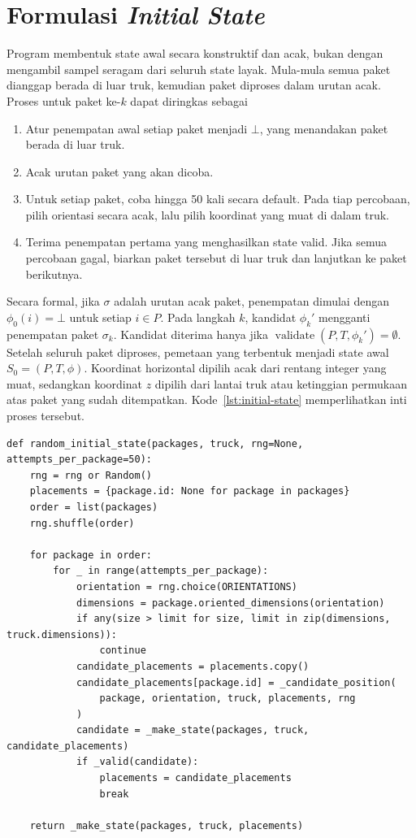 \section{Formulasi \textit{Initial State}}

Program membentuk state awal secara konstruktif dan acak, bukan dengan mengambil sampel seragam dari seluruh state layak. Mula-mula semua paket dianggap berada di luar truk, kemudian paket diproses dalam urutan acak. Proses untuk paket ke-$k$ dapat diringkas sebagai

\begin{enumerate}
    \renewcommand{\labelenumi}{(\arabic{enumi})}
    \item Atur penempatan awal setiap paket menjadi $\bot$, yang menandakan paket berada di luar truk.
    \item Acak urutan paket yang akan dicoba.
    \item Untuk setiap paket, coba hingga 50 kali secara default. Pada tiap percobaan, pilih orientasi secara acak, lalu pilih koordinat yang muat di dalam truk.
    \item Terima penempatan pertama yang menghasilkan state valid. Jika semua percobaan gagal, biarkan paket tersebut di luar truk dan lanjutkan ke paket berikutnya.
\end{enumerate}

Secara formal, jika $\sigma$ adalah urutan acak paket, penempatan dimulai dengan $\phi_0(i)=\bot$ untuk setiap $i\in P$. Pada langkah $k$, kandidat $\phi_k'$ mengganti penempatan paket $\sigma_k$. Kandidat diterima hanya jika $\operatorname{validate}(P,T,\phi_k')=\emptyset$. Setelah seluruh paket diproses, pemetaan yang terbentuk menjadi state awal $S_0=(P,T,\phi)$. Koordinat horizontal dipilih acak dari rentang integer yang muat, sedangkan koordinat $z$ dipilih dari lantai truk atau ketinggian permukaan atas paket yang sudah ditempatkan. Kode~\ref{lst:initial-state} memperlihatkan inti proses tersebut.

\begin{lstlisting}[caption={Pembentukan state awal acak yang valid},label={lst:initial-state}]
def random_initial_state(packages, truck, rng=None, attempts_per_package=50):
    rng = rng or Random()
    placements = {package.id: None for package in packages}
    order = list(packages)
    rng.shuffle(order)

    for package in order:
        for _ in range(attempts_per_package):
            orientation = rng.choice(ORIENTATIONS)
            dimensions = package.oriented_dimensions(orientation)
            if any(size > limit for size, limit in zip(dimensions, truck.dimensions)):
                continue
            candidate_placements = placements.copy()
            candidate_placements[package.id] = _candidate_position(
                package, orientation, truck, placements, rng
            )
            candidate = _make_state(packages, truck, candidate_placements)
            if _valid(candidate):
                placements = candidate_placements
                break

    return _make_state(packages, truck, placements)
\end{lstlisting}

